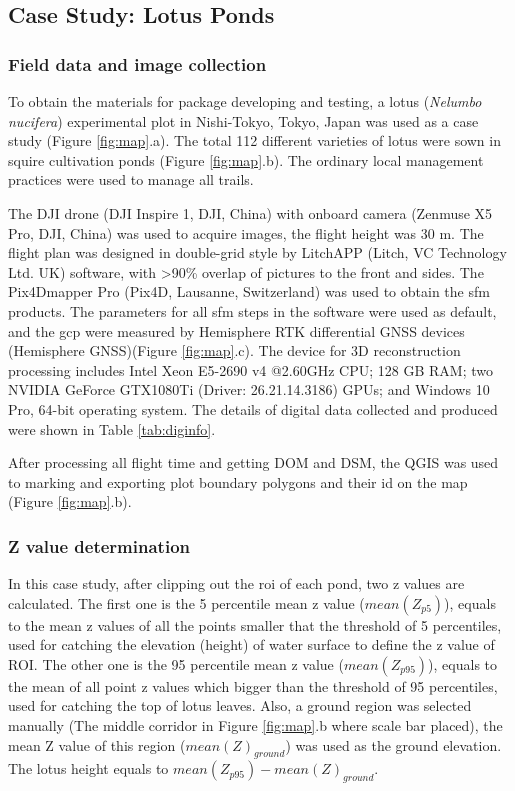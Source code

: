 \documentclass{configs/bmcart}
\begin{document}
\subsection*{Case Study: Lotus Ponds}

\subsubsection*{Field data and image collection}
To obtain the materials for package developing and testing, a lotus (\textit{Nelumbo nucifera}) experimental plot in Nishi-Tokyo, Tokyo, Japan was used as a case study (Figure \ref{fig:map}.a). The total 112 different varieties of lotus were sown in squire cultivation ponds (Figure \ref{fig:map}.b). The ordinary local management practices were used to manage all trails.

The DJI drone (DJI Inspire 1, DJI, China) with onboard camera (Zenmuse X5 Pro, DJI, China) was used to acquire images, the flight height was 30 m. The flight plan was designed in double-grid style by LitchAPP (Litch, VC Technology Ltd. UK) software, with >90\% overlap of pictures to the front and sides. The Pix4Dmapper Pro (Pix4D, Lausanne, Switzerland) was used to obtain the \acrshort*{sfm} products. The parameters for all \acrshort*{sfm} steps in the software were used as default, and the \acrshort*{gcp} were measured by Hemisphere RTK differential GNSS devices (Hemisphere GNSS)(Figure \ref{fig:map}.c). The device for 3D reconstruction processing includes Intel Xeon E5-2690 v4 @2.60GHz CPU; 128 GB RAM; two NVIDIA GeForce GTX1080Ti (Driver: 26.21.14.3186) GPUs; and Windows 10 Pro, 64-bit operating system. The details of digital data collected and produced were shown in Table \ref{tab:diginfo}.

After processing all flight time and getting DOM and DSM, the QGIS was used to marking and exporting plot boundary polygons and their id on the map (Figure \ref{fig:map}.b).

\subsubsection*{Z value determination}
In this case study, after clipping out the \acrshort*{roi} of each pond, two z values are calculated. The first one is the 5 percentile mean z value ($mean(Z_{p5})$), equals to the mean z values of all the points smaller that the threshold of 5 percentiles, used for catching the elevation (height) of water surface to define the z value of ROI. The other one is the 95 percentile mean z value ($mean(Z_{p95})$), equals to the mean of all point z values which bigger than the threshold of 95 percentiles, used for catching the top of lotus leaves. Also, a ground region was selected manually (The middle corridor in Figure \ref{fig:map}.b where scale bar placed), the mean Z value of this region ($mean(Z)_{ground}$) was used as the ground elevation. The lotus height equals to $mean(Z_{p95}) - mean(Z)_{ground}$.
\end{document}
